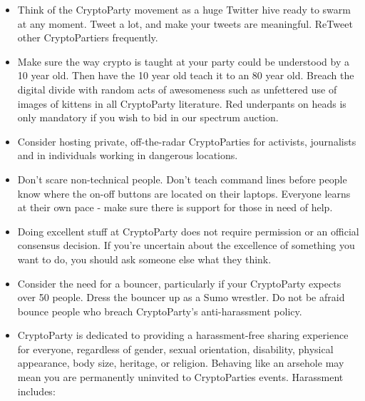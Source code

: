 \begin{itemize}
\item
  Think of the CryptoParty movement as a huge Twitter hive ready to
  swarm at any moment. Tweet a lot, and make your tweets are meaningful.
  ReTweet other CryptoPartiers frequently.
\item
  Make sure the way crypto is taught at your party could be understood
  by a 10 year old. Then have the 10 year old teach it to an 80 year
  old. Breach the digital divide with random acts of awesomeness such as
  unfettered use of images of kittens in all CryptoParty literature. Red
  underpants on heads is only mandatory if you wish to bid in our
  spectrum auction.
\item
  Consider hosting private, off-the-radar CryptoParties for activists,
  journalists and in individuals working in dangerous locations.
\item
  Don't scare non-technical people. Don't teach command lines before
  people know where the on-off buttons are located on their laptops.
  Everyone learns at their own pace - make sure there is support for
  those in need of help.
\item
  Doing excellent stuff at CryptoParty does not require permission or an
  official consensus decision. If you're uncertain about the excellence
  of something you want to do, you should ask someone else what they
  think.
\item
  Consider the need for a bouncer, particularly if your CryptoParty
  expects over 50 people. Dress the bouncer up as a Sumo wrestler. Do
  not be afraid bounce people who breach CryptoParty's anti-harassment
  policy.
\item
  CryptoParty is dedicated to providing a harassment-free sharing
  experience for everyone, regardless of gender, sexual orientation,
  disability, physical appearance, body size, heritage, or religion.
  Behaving like an arsehole may mean you are permanently uninvited to
  CryptoParties events. Harassment includes:


\end{itemize}
